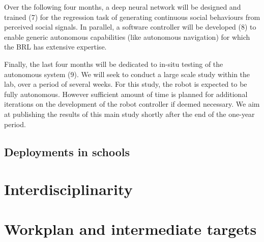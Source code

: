 \documentclass[11pt]{report}
\begin{document}
Over the following four months, a deep neural network will be designed
and trained (7) for the regression task of generating continuous social
behaviours from perceived social signals. In parallel, a software
controller will be developed (8) to enable generic autonomous
capabilities (like autonomous navigation) for which the BRL has
extensive expertise.

Finally, the last four months will be dedicated to in-situ testing of
the autonomous system (9). We will seek to conduct a large scale study
within the lab, over a period of several weeks. For this study, the
robot is expected to be fully autonomous. However sufficient amount of
time is planned for additional iterations on the development of the
robot controller if deemed necessary. We aim at publishing the results
of this main study shortly after the end of the one-year period.


\subsection{Deployments in schools}

\section{Interdisciplinarity}



\newpage
\section{Workplan and intermediate targets}\label{workplan}


\newcommand{\wpOne}{Project management}
\newcommand{\wpOneShort}{\wpOne{}}

\newcommand{\wpTwo}{Technology to socially influence human-human interactions}
\newcommand{\wpTwoShort}{Social influence}
\end{document}
